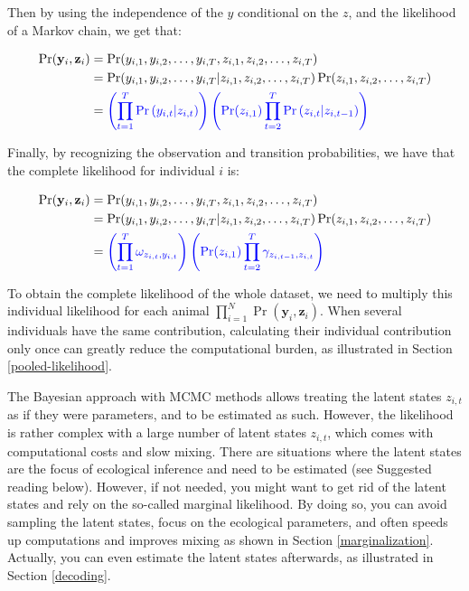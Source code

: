 \documentclass[
  12pt,
]{krantz}
\begin{document}
Then by using the independence of the \(y\) conditional on the \(z\), and the likelihood of a Markov chain, we get that:

\begin{align*}
\Pr(\mathbf{y}_i, \mathbf{z}_i) &= \Pr(y_{i,1}, y_{i,2}, \ldots, y_{i,T}, z_{i,1}, z_{i,2}, \ldots, z_{i,T})\\
                  &= \Pr(y_{i,1}, y_{i,2}, \ldots, y_{i,T} | z_{i,1}, z_{i,2}, \ldots, z_{i,T}) \Pr(z_{i,1}, z_{i,2}, \ldots, z_{i,T})\\
                &= \color{blue}{\left(\prod_{t=1}^T{\Pr{(y_{i,t} | z_{i,t})}}\right) \left(\Pr(z_{i,1}) \prod_{t=2}^T{\Pr{(z_{i,t} | z_{i,t-1})}}\right)}\\
\end{align*}

Finally, by recognizing the observation and transition probabilities, we have that the complete likelihood for individual \(i\) is:

\begin{align*}
\Pr(\mathbf{y}_i, \mathbf{z}_i) &= \Pr(y_{i,1}, y_{i,2}, \ldots, y_{i,T}, z_{i,1}, z_{i,2}, \ldots, z_{i,T})\\
                  &= \Pr(y_{i,1}, y_{i,2}, \ldots, y_{i,T} | z_{i,1}, z_{i,2}, \ldots, z_{i,T}) \Pr(z_{i,1}, z_{i,2}, \ldots, z_{i,T})\\
                &= \color{blue}{\left(\prod_{t=1}^T{\omega_{z_{i,t}, y_{i,t}}}\right) \left(\Pr(z_{i,1}) \prod_{t=2}^T{\gamma_{z_{i,t-1},z_{i,t}}}\right)}\\
\end{align*}

To obtain the complete likelihood of the whole dataset, we need to multiply this individual likelihood for each animal \(\displaystyle{\prod_{i=1}^N{\Pr(\mathbf{y}_i,\mathbf{z}_i)}}\). When several individuals have the same contribution, calculating their individual contribution only once can greatly reduce the computational burden, as illustrated in Section \ref{pooled-likelihood}.

The Bayesian approach with MCMC methods allows treating the latent states \(z_{i,t}\) as if they were parameters, and to be estimated as such. However, the likelihood is rather complex with a large number of latent states \(z_{i,t}\), which comes with computational costs and slow mixing. There are situations where the latent states are the focus of ecological inference and need to be estimated (see Suggested reading below). However, if not needed, you might want to get rid of the latent states and rely on the so-called marginal likelihood. By doing so, you can avoid sampling the latent states, focus on the ecological parameters, and often speeds up computations and improves mixing as shown in Section \ref{marginalization}. Actually, you can even estimate the latent states afterwards, as illustrated in Section \ref{decoding}.
\end{document}
